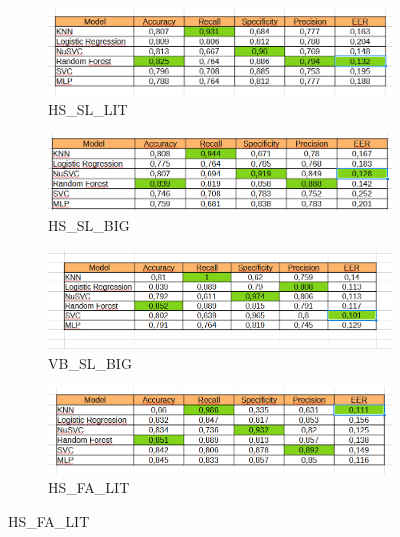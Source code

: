 \documentclass{article}
\begin{document}
\begin{figure}[H]
    \centering
    \begin{subfigure}[b]{0.65\textwidth}
        \includegraphics[width=\linewidth]{Images/Results/Verification_single_intruders/st/HS_SL_LIT.png}
        \caption{HS\_SL\_LIT}
    \end{subfigure}
    \begin{subfigure}[b]{0.65\textwidth}
        \includegraphics[width=\linewidth]{Images/Results/Verification_single_intruders/st/HS_SL_BIG.png}
        \caption{HS\_SL\_BIG}
    \end{subfigure}

    \begin{subfigure}[b]{0.65\textwidth}
        \includegraphics[width=\linewidth]{Images/Results/Verification_single_intruders/st/VB_SL_BIG.png}
        \caption{VB\_SL\_BIG}
    \end{subfigure}
    \begin{subfigure}[b]{0.65\textwidth}
        \includegraphics[width=\linewidth]{Images/Results/Verification_single_intruders/st/HS_FA_LIT.png}
        \caption{HS\_FA\_LIT}
    \end{subfigure}


\end{figure}
\end{document}
